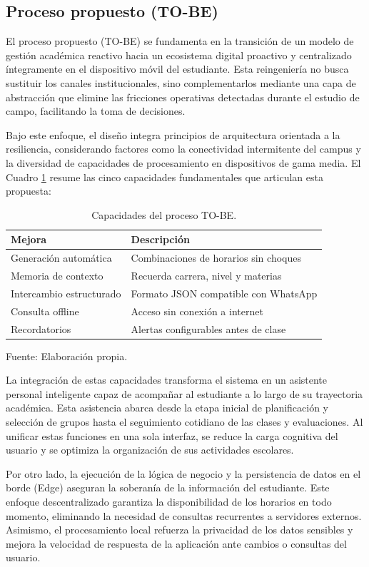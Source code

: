 \subsection{Proceso propuesto (TO-BE)}

El proceso propuesto (TO-BE) se fundamenta en la transición de un modelo de gestión académica reactivo hacia un ecosistema digital proactivo y centralizado íntegramente en el dispositivo móvil del estudiante. Esta reingeniería no busca sustituir los canales institucionales, sino complementarlos mediante una capa de abstracción que elimine las fricciones operativas detectadas durante el estudio de campo, facilitando la toma de decisiones.

Bajo este enfoque, el diseño integra principios de arquitectura orientada a la resiliencia, considerando factores como la conectividad intermitente del campus y la diversidad de capacidades de procesamiento en dispositivos de gama media. El Cuadro \ref{tab:mejoras_tobe} resume las cinco capacidades fundamentales que articulan esta propuesta:

\begin{table}[H]
\centering
\begin{tabularx}{\linewidth}{p{4.5cm} X}
\toprule
Mejora & Descripción \\
\midrule
Generación automática & Combinaciones de horarios sin choques \\
Memoria de contexto & Recuerda carrera, nivel y materias \\
Intercambio estructurado & Formato JSON compatible con WhatsApp \\
Consulta offline & Acceso sin conexión a internet \\
Recordatorios & Alertas configurables antes de clase \\
\bottomrule
\end{tabularx}
\caption{Capacidades del proceso TO-BE.}\label{tab:mejoras_tobe}
Fuente: Elaboración propia.
\end{table}

La integración de estas capacidades transforma el sistema en un asistente personal inteligente capaz de acompañar al estudiante a lo largo de su trayectoria académica. Esta asistencia abarca desde la etapa inicial de planificación y selección de grupos hasta el seguimiento cotidiano de las clases y evaluaciones. Al unificar estas funciones en una sola interfaz, se reduce la carga cognitiva del usuario y se optimiza la organización de sus actividades escolares.

Por otro lado, la ejecución de la lógica de negocio y la persistencia de datos en el borde (Edge) aseguran la soberanía de la información del estudiante. Este enfoque descentralizado garantiza la disponibilidad de los horarios en todo momento, eliminando la necesidad de consultas recurrentes a servidores externos. Asimismo, el procesamiento local refuerza la privacidad de los datos sensibles y mejora la velocidad de respuesta de la aplicación ante cambios o consultas del usuario.

